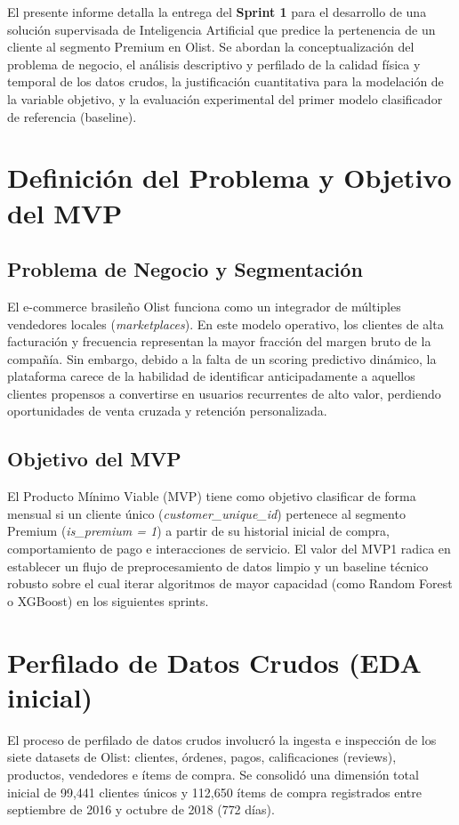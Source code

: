 \documentclass[journal,letterpaper]{IEEEtran}
\begin{document}
El presente informe detalla la entrega del \textbf{Sprint 1} para el desarrollo de una solución supervisada de Inteligencia Artificial que predice la pertenencia de un cliente al segmento Premium en Olist. Se abordan la conceptualización del problema de negocio, el análisis descriptivo y perfilado de la calidad física y temporal de los datos crudos, la justificación cuantitativa para la modelación de la variable objetivo, y la evaluación experimental del primer modelo clasificador de referencia (baseline).

\section{Definición del Problema y Objetivo del MVP}
\subsection{Problema de Negocio y Segmentación}
El e-commerce brasileño Olist funciona como un integrador de múltiples vendedores locales (\textit{marketplaces}). En este modelo operativo, los clientes de alta facturación y frecuencia representan la mayor fracción del margen bruto de la compañía. Sin embargo, debido a la falta de un scoring predictivo dinámico, la plataforma carece de la habilidad de identificar anticipadamente a aquellos clientes propensos a convertirse en usuarios recurrentes de alto valor, perdiendo oportunidades de venta cruzada y retención personalizada.

\subsection{Objetivo del MVP}
El Producto Mínimo Viable (MVP) tiene como objetivo clasificar de forma mensual si un cliente único (\textit{customer\_unique\_id}) pertenece al segmento Premium (\textit{is\_premium = 1}) a partir de su historial inicial de compra, comportamiento de pago e interacciones de servicio. El valor del MVP1 radica en establecer un flujo de preprocesamiento de datos limpio y un baseline técnico robusto sobre el cual iterar algoritmos de mayor capacidad (como Random Forest o XGBoost) en los siguientes sprints.

\section{Perfilado de Datos Crudos (EDA inicial)}
El proceso de perfilado de datos crudos involucró la ingesta e inspección de los siete datasets de Olist: clientes, órdenes, pagos, calificaciones (reviews), productos, vendedores e ítems de compra. Se consolidó una dimensión total inicial de 99,441 clientes únicos y 112,650 ítems de compra registrados entre septiembre de 2016 y octubre de 2018 (772 días).
\end{document}

